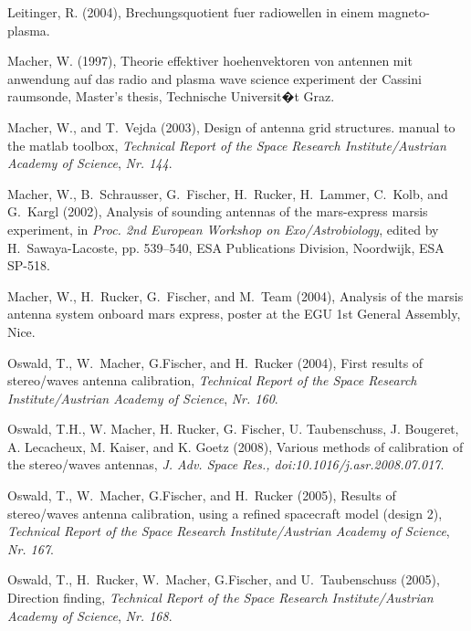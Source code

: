 \documentclass[a4paper,14pt]{extbook}
\begin{document}
\begin{thebibliography}{24}
Leitinger, R. (2004), Brechungsquotient fuer radiowellen in einem
  magneto-plasma.

Macher, W. (1997), Theorie effektiver hoehenvektoren von antennen mit anwendung
  auf das radio and plasma wave science experiment der Cassini raumsonde,
  Master's thesis, Technische Universit�t Graz.

Macher, W., and T.~Vejda (2003), Design of antenna grid structures. manual to
  the matlab toolbox, \textit{Technical Report of the Space Research
  Institute/Austrian Academy of Science}, \textit{Nr. 144}.

Macher, W., B.~Schrausser, G.~Fischer, H.~Rucker, H.~Lammer, C.~Kolb, and
  G.~Kargl (2002), Analysis of sounding antennas of the mars-express marsis
  experiment, in \textit{Proc. 2nd European Workshop on Exo/Astrobiology},
  edited by H.~Sawaya-Lacoste, pp. 539--540, ESA Publications Division,
  Noordwijk, ESA SP-518.

Macher, W., H.~Rucker, G.~Fischer, and M.~Team (2004), Analysis of the marsis
  antenna system onboard mars express, poster at the EGU 1st General Assembly,
  Nice.

Oswald, T., W.~Macher, G.Fischer, and H.~Rucker (2004), First results of
  stereo/waves antenna calibration, \textit{Technical Report of the Space
  Research Institute/Austrian Academy of Science}, \textit{Nr. 160}.

Oswald, T.H., W. Macher, H. Rucker, G. Fischer, U. Taubenschuss,
J. Bougeret, A. Lecacheux, M. Kaiser, and K. Goetz (2008), Various
methods of calibration of the stereo/waves antennas, \textit{J. Adv. Space Res.,
doi:10.1016/j.asr.2008.07.017}.

Oswald, T., W.~Macher, G.Fischer, and H.~Rucker (2005{}), Results
  of stereo/waves antenna calibration, using a refined spacecraft model (design
  2), \textit{Technical Report of the Space Research Institute/Austrian Academy
  of Science}, \textit{Nr. 167}.

Oswald, T., H.~Rucker, W.~Macher, G.Fischer, and U.~Taubenschuss
  (2005{}), Direction finding, \textit{Technical Report of the
  Space Research Institute/Austrian Academy of Science}, \textit{Nr. 168}.


\end{thebibliography}
\end{document}

